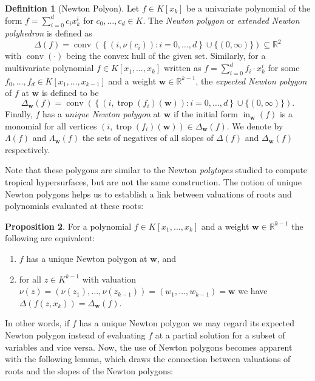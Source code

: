 \documentclass[
  paper=a4,
  titlepage,
  bibliography=totoc,
  pagesize=pdftex
]{scrartcl}
\numberwithin{figure}{section}
\numberwithin{equation}{section}
\numberwithin{table}{section}
\newcommand*\setR{\mathds{R}}
\let\vec\mathbf
\DeclareMathOperator{\trop}{trop}
\DeclareMathOperator{\initial}{in}
\DeclareMathOperator{\conv}{conv}
\theoremstyle{definition}
\newtheorem{definition}{Definition}
\newtheorem{proposition}[definition]{Proposition}
\numberwithin{definition}{section}
\begin{document}
\begin{definition}[Newton Polyon]
  Let $f \in K[x_k]$ be a univariate polynomial of the form $f = \sum_{i=0}^d c_i x_k^i$
  for $c_0, \dots, c_d \in K$. The \emph{Newton polygon} or \emph{extended Newton
  polyhedron} is defined as
  \[
    \Delta(f) = \conv \left(
      \left\{ (i, \nu(c_i)) : i = 0, \dots, d \right\}
      \cup \{ (0, \infty) \}
    \right)
    \subseteq \setR^2
  \]
  with $\conv(\cdot)$ being the convex hull of the given set. Similarly, for a
  multivariate polynomial $f \in K[x_1, \dots, x_k]$ written as $f = \sum_{i=0}^d f_i
  \cdot x_k^i$ for some $f_0, \dots, f_d \in K[x_1, \dots, x_{k-1}]$ and a weight $\vec w
  \in \setR^{k-1}$, the \emph{expected Newton polygon} of $f$ at $\vec w$ is defined to be
  \[
    \Delta_{\vec w}(f) = \conv\left(
      \left\{ (i, \trop(f_i)(\vec w)) : i = 0, \dots, d \right\}
      \cup \{ (0, \infty) \}
    \right).
  \]
  Finally, $f$ has a \emph{unique Newton polygon} at $\vec w$ if the initial form
  $\initial_{\vec w}(f)$ is a monomial for all vertices $(i, \trop(f_i)(\vec w)) \in
  \Delta_{\vec w}(f)$. We denote by $\Lambda(f)$ and $\Lambda_{\vec w}(f)$ the sets of
  negatives of all slopes of $\Delta(f)$ and $\Delta_{\vec w}(f)$ respectively.
  \label{def:newtonPoly}
\end{definition}

Note that these polygons are similar to the Newton \emph{polytopes} studied to compute
tropical hypersurfaces, but are not the same construction. The notion of unique Newton
polygons helps us to establish a link between valuations of roots and polynomials
evaluated at these roots:

\begin{proposition}
  \label{prp:expectedNewt}
  For a polynomial $f \in K[x_1, \dots, x_k]$ and a weight $\vec w \in \setR^{k-1}$ the
  following are equivalent:
  \begin{enumerate}
    \item $f$ has a unique Newton polygon at $\vec w$, and
    \item for all $z \in K^{k-1}$ with valuation $\nu(z) = (\nu(z_1), \dots, \nu(z_{k-1}))
      = (w_1, \dots, w_{k-1}) = \vec w$ we have $\Delta(f(z, x_k)) = \Delta_{\vec w}(f)$.
  \end{enumerate}
\end{proposition}

In other words, if $f$ has a unique Newton polygon we may regard its expected Newton
polygon instead of evaluating $f$ at a partial solution for a subset of variables and vice
versa. Now, the use of Newton polygons becomes apparent with the following lemma, which
draws the connection between valuations of roots and the slopes of the Newton polygons:
\end{document}
